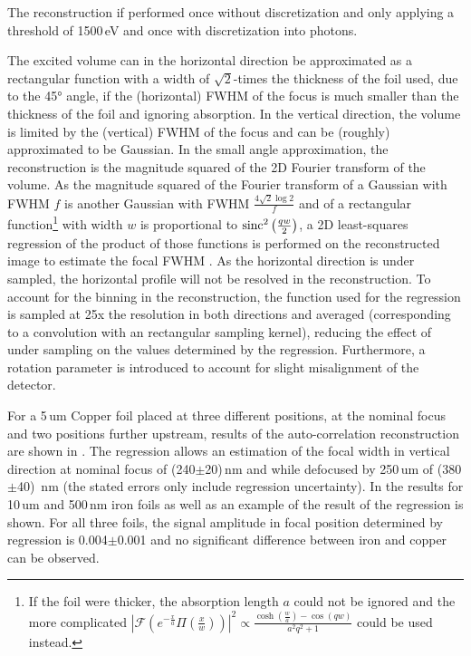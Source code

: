 The reconstruction if performed once without discretization and only applying a threshold of 1500\,eV and once with discretization into photons. 




The excited volume can in the horizontal direction be approximated as a rectangular function with a width of $\sqrt{2}$-times the thickness of the foil used, due to the 45° angle, if the (horizontal) FWHM of the focus is much smaller than the thickness of the foil and ignoring absorption.  In the vertical direction, the volume is limited by the (vertical) FWHM of the focus and can be (roughly) approximated to be Gaussian. 
In the small angle approximation, the reconstruction is the magnitude squared of the 2D Fourier transform of the volume. As the magnitude squared of the Fourier transform of a Gaussian with FWHM $f$ is another Gaussian with FWHM $\frac{4\sqrt{2}\log{2}}{f}$ and of a rectangular function\footnote{If the foil were thicker, the absorption length $a$ could not be ignored and the more complicated $\left|\mathscr{F}\left(e^{-\frac{x}{a}} \Pi \left(\frac{x}{w}\right)\right)\right|^2 \propto \frac{\cosh \left(\frac{w}{a}\right)-\cos (q w)}{a^2 q^2+1}$
	could be used instead.} with width $w$ is proportional to $\operatorname{sinc}^2{\left(\frac{q w}{2}\right)}$, a 2D least-squares regression of the product of those functions is performed on the reconstructed image to estimate the focal FWHM \cite{butz2015}. As the horizontal direction is under sampled, the horizontal profile will not be resolved in the reconstruction. To account for the binning in the reconstruction, the function used for the regression is sampled at 25x the resolution in both directions and averaged (corresponding to a convolution with an rectangular sampling kernel), reducing the effect of under sampling on the values determined by the regression. Furthermore, a rotation parameter is introduced to account for slight misalignment of the detector.

For a 5\,um Copper foil placed at three different positions, at the nominal focus and two positions further upstream, results of the auto-correlation reconstruction are shown in .
The regression allows an estimation of the focal width in vertical direction at nominal focus of (240$\pm$20)\,nm and while defocused by 250\,um of (380$\pm$40)\, nm (the stated errors only include regression uncertainty).
In  the results for 10\,um and 500\,nm iron foils as well as an example of the result of the regression is shown.
For all three foils, the signal amplitude in focal position determined by regression is 0.004$\pm$0.001 and no significant difference between iron and copper can be observed. 

